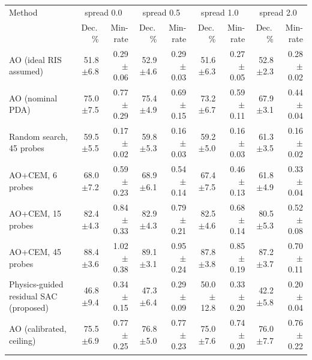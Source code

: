 \begin{tabular}{lrrrrrrrr}
\toprule
Method & \multicolumn{2}{c}{spread 0.0} & \multicolumn{2}{c}{spread 0.5} & \multicolumn{2}{c}{spread 1.0} & \multicolumn{2}{c}{spread 2.0} \\
 & Dec.\,\% & Min-rate & Dec.\,\% & Min-rate & Dec.\,\% & Min-rate & Dec.\,\% & Min-rate \\
\midrule
AO (ideal RIS assumed) & 51.8$\pm$6.8 & 0.29$\pm$0.06 & 52.9$\pm$4.6 & 0.29$\pm$0.03 & 51.6$\pm$6.3 & 0.27$\pm$0.05 & 52.8$\pm$2.3 & 0.28$\pm$0.02 \\
AO (nominal PDA) & 75.0$\pm$7.5 & 0.77$\pm$0.29 & 75.4$\pm$4.9 & 0.69$\pm$0.15 & 73.2$\pm$6.7 & 0.59$\pm$0.11 & 67.9$\pm$3.1 & 0.44$\pm$0.04 \\
Random search, 45 probes & 59.5$\pm$5.5 & 0.17$\pm$0.02 & 59.8$\pm$5.3 & 0.16$\pm$0.03 & 59.2$\pm$5.0 & 0.16$\pm$0.03 & 61.3$\pm$3.5 & 0.16$\pm$0.02 \\
AO+CEM, 6 probes & 68.0$\pm$7.2 & 0.59$\pm$0.23 & 68.9$\pm$6.1 & 0.54$\pm$0.14 & 67.4$\pm$7.5 & 0.46$\pm$0.13 & 61.8$\pm$4.9 & 0.33$\pm$0.04 \\
AO+CEM, 15 probes & 82.4$\pm$4.3 & 0.84$\pm$0.33 & 82.9$\pm$4.3 & 0.79$\pm$0.21 & 82.5$\pm$4.6 & 0.68$\pm$0.14 & 80.5$\pm$5.3 & 0.52$\pm$0.08 \\
AO+CEM, 45 probes & 88.4$\pm$3.6 & 1.02$\pm$0.38 & 89.1$\pm$3.1 & 0.95$\pm$0.24 & 87.8$\pm$3.8 & 0.85$\pm$0.19 & 87.2$\pm$3.7 & 0.70$\pm$0.11 \\
Physics-guided residual SAC (proposed) & 46.8$\pm$9.4 & 0.34$\pm$0.15 & 47.3$\pm$6.4 & 0.29$\pm$0.09 & 50.0$\pm$12.8 & 0.33$\pm$0.20 & 42.2$\pm$5.8 & 0.20$\pm$0.04 \\
AO (calibrated, ceiling) & 75.5$\pm$6.9 & 0.77$\pm$0.25 & 76.8$\pm$5.0 & 0.77$\pm$0.23 & 75.0$\pm$7.6 & 0.74$\pm$0.20 & 76.0$\pm$7.7 & 0.76$\pm$0.22 \\
\bottomrule
\end{tabular}